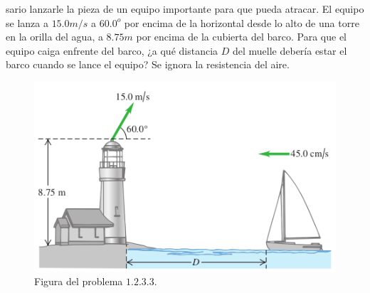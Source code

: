 \begin{enumerate}
sario lanzarle la pieza de un equipo importante para que pueda atracar.
El equipo se lanza a $15.0 m/s$ a $60.0^o$ por encima de la horizontal
desde lo alto de una torre en la orilla del agua, a $8.75 m$ por encima de
la cubierta del barco. Para que el equipo caiga enfrente
del barco, ¿a qué distancia $D$ del muelle debería estar el barco cuando
se lance el equipo? Se ignora la resistencia del aire.
		\begin{figure}[H]
			\centering
			\includegraphics[scale=0.5]{Images/barco.png}
			\caption{Figura del problema $1.2.3.3.$}
			\label{1.2.3.2}
		\end{figure}
	\end{enumerate}

